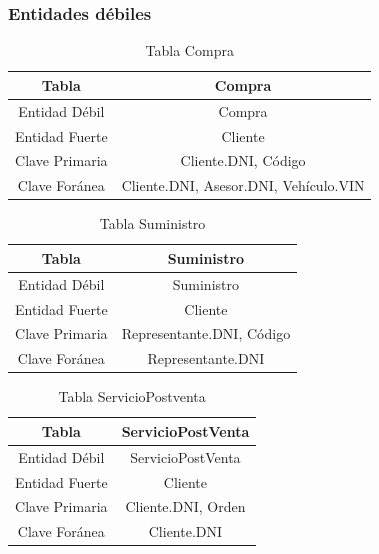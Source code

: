 \documentclass[12pt]{article}
\begin{document}
\newpage

\subsubsection{Entidades d\'ebiles}

\begin{table}[htbp]
\begin{center}
\begin{tabular}{|c|c|}
\hline
Tabla & Compra \\
\hline
Entidad Débil & Compra \\
\hline
Entidad Fuerte & Cliente \\
\hline
Clave Primaria & Cliente.DNI, Código \\
\hline
Clave Foránea & Cliente.DNI, Asesor.DNI, Vehículo.VIN \\
\hline
\end{tabular}
\caption{Tabla Compra}
\end{center}
\end{table}


\begin{table}[htbp]
\begin{center}
\begin{tabular}{|c|c|}
\hline
Tabla & Suministro \\
\hline
Entidad Débil & Suministro \\
\hline
Entidad Fuerte & Cliente \\
\hline
Clave Primaria & Representante.DNI, Código \\
\hline
Clave Foránea & Representante.DNI \\
\hline
\end{tabular}
\caption{Tabla Suministro}
\end{center}
\end{table}


\begin{table}[htbp]
\begin{center}
\begin{tabular}{|c|c|}
\hline
Tabla & ServicioPostVenta \\
\hline
Entidad Débil & ServicioPostVenta \\
\hline
Entidad Fuerte & Cliente \\
\hline
Clave Primaria & Cliente.DNI, Orden \\
\hline
Clave Foránea & Cliente.DNI \\
\hline
\end{tabular}
\caption{Tabla ServicioPostventa}
\end{center}
\end{table}
\end{document}
